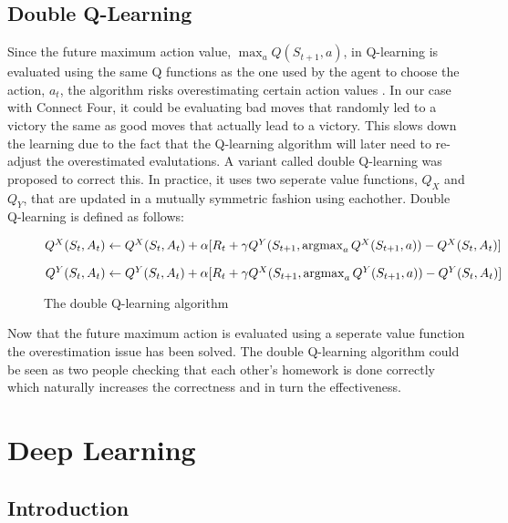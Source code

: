\documentclass[titlepage]{article}
\begin{document}
\subsection{Double Q-Learning}

\vskip 0.2cm

Since the future maximum action value, $\max_{a}Q(S_{t+1}, a)$, in Q-learning is evaluated using the same Q functions as the one used by the agent to choose the action, $a_{t}$, the algorithm risks overestimating certain action values \cite{doubleq}. In our case with Connect Four, it could be evaluating bad moves that randomly led to a victory the same as good moves that actually lead to a victory. This slows down the learning due to the fact that the Q-learning algorithm will later need to re-adjust the overestimated evalutations. A variant called double Q-learning \cite{doubleq} was proposed to correct this. In practice, it uses two seperate value functions, $Q_{X}$ and $Q_{Y}$, that are updated in a mutually symmetric fashion using eachother. Double Q-learning is defined as follows:

\vskip 0.5cm

\begin{figure}[h]
    \centerline{$Q^X(S_{t}, A_{t}) \leftarrow Q^X(S_{t}, A_{t}) + \alpha[R_{t} + \gamma Q^Y(S_{t+1}, \operatorname*{argmax}_{a}Q^X(S_{t+1}, a)) - Q^X(S_{t}, A_{t})]$}
    \vskip 0.5cm
    \centerline{$Q^Y(S_{t}, A_{t}) \leftarrow Q^Y(S_{t}, A_{t}) + \alpha[R_{t} + \gamma Q^X(S_{t+1}, \operatorname*{argmax}_{a}Q^Y(S_{t+1}, a)) - Q^Y(S_{t}, A_{t})]$}
    \vskip 0.2cm
    \caption{The double Q-learning algorithm}
\end{figure}

\vskip 0.3cm

\noindent
Now that the future maximum action is evaluated using a seperate value function the overestimation issue has been solved. The double Q-learning algorithm could be seen as two people checking that each other's homework is done correctly which naturally increases the correctness and in turn the effectiveness.

\newpage

\section{Deep Learning}

\subsection{Introduction}
\end{document}
